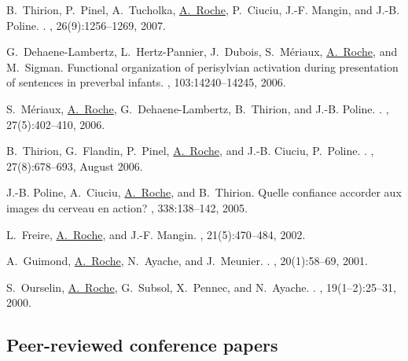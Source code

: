 \begin{thebibliography}{100}
B.~Thirion, P.~Pinel, A.~Tucholka, \underline{A.~Roche}, P.~Ciuciu, J.-F. Mangin, and J.-B.
  Poline.
.
, 26(9):1256--1269, 2007.

G.~Dehaene-Lambertz, L.~Hertz-Pannier, J.~Dubois, S.~M\'eriaux, \underline{A.~Roche}, and
  M.~Sigman.
\newblock Functional organization of perisylvian activation during presentation
  of sentences in preverbal infants.
,
  103:14240--14245, 2006.

S.~M\'eriaux, \underline{A.~Roche}, G.~Dehaene-Lambertz, B.~Thirion, and J.-B. Poline.
.
, 27(5):402--410, 2006.

B.~Thirion, G.~Flandin, P.~Pinel, \underline{A.~Roche}, and J.-B. Ciuciu, P.~Poline.
.
, 27(8):678--693, August 2006.

J.-B. Poline, A.~Ciuciu, \underline{A.~Roche}, and B.~Thirion.
\newblock Quelle confiance accorder aux images du cerveau en action?
, 338:138--142, 2005.

L.~Freire, \underline{A.~Roche}, and J.-F. Mangin.
, 21(5):470--484, 2002.

A.~Guimond, \underline{A.~Roche}, N.~Ayache, and J.~Meunier.
.
, 20(1):58--69, 2001.

S.~Ourselin, \underline{A.~Roche}, G.~Subsol, X.~Pennec, and N.~Ayache.
.
, 19(1--2):25--31, 2000.


\subsection*{Peer-reviewed conference papers}


\end{thebibliography}
